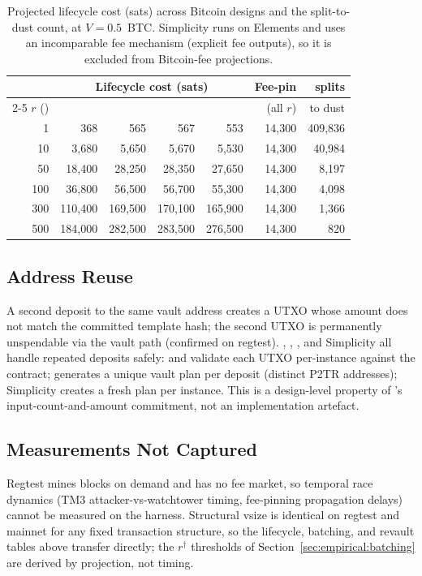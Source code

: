 \begin{table}[h]
\centering
\caption{Projected lifecycle cost (sats) across Bitcoin designs
and the \opccv{} split-to-dust count, at $V = 0.5$~BTC. Simplicity
runs on Elements and uses an incomparable fee mechanism (explicit
fee outputs), so it is excluded from Bitcoin-fee projections.}
\label{tab:fee_sensitivity_appendix}
\footnotesize
\begin{tabular}{@{}rrrrrrr@{}}
\toprule
& \multicolumn{4}{c}{Lifecycle cost (sats)} & Fee-pin & \opccv{} splits \\
\cmidrule(lr){2-5}
$r$ (\satvB{}) & \opctv{} & \opccv{} & \opvault{} & \catcsfs{} & (all $r$) & to dust \\
\midrule
1   &     368 &     565 &     567 &     553 & 14{,}300 & 409{,}836 \\
10  &   3{,}680 &   5{,}650 &   5{,}670 &   5{,}530 & 14{,}300 &  40{,}984 \\
50  &  18{,}400 &  28{,}250 &  28{,}350 &  27{,}650 & 14{,}300 &   8{,}197 \\
100 &  36{,}800 &  56{,}500 &  56{,}700 &  55{,}300 & 14{,}300 &   4{,}098 \\
300 & 110{,}400 & 169{,}500 & 170{,}100 & 165{,}900 & 14{,}300 &   1{,}366 \\
500 & 184{,}000 & 282{,}500 & 283{,}500 & 276{,}500 & 14{,}300 &     820 \\
\bottomrule
\end{tabular}
\end{table}

\subsection{Address Reuse}
\label{app:meas:reuse}

A second deposit to the same \opctv{} vault address creates a UTXO
whose amount does not match the committed template hash; the
second UTXO is permanently unspendable via the vault path
(confirmed on regtest). \opccv{}, \opvault{}, \catcsfs{}, and Simplicity
all handle repeated deposits safely: \opccv{} and \opvault{} validate
each UTXO per-instance against the contract; \catcsfs{} generates a
unique vault plan per deposit (distinct P2TR addresses);
Simplicity creates a fresh plan per instance. This is a
design-level property of \opctv{}'s input-count-and-amount commitment,
not an implementation artefact.

\subsection{Measurements Not Captured}
\label{app:meas:limits}

Regtest mines blocks on demand and has no fee market, so temporal
race dynamics (TM3 attacker-vs-watchtower timing, fee-pinning
propagation delays) cannot be measured on the harness. Structural
vsize is identical on regtest and mainnet for any fixed
transaction structure, so the lifecycle, batching, and revault
tables above transfer directly; the $r^\dagger$ thresholds of
Section~\ref{sec:empirical:batching} are derived by projection,
not timing.

\providecommand{\todo}[2][]{\textbf{[TODO: #2]}}
